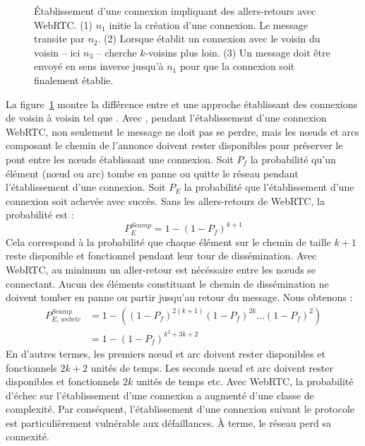 \begin{figure}
  \begin{center}
    
    \caption{\label{repl:fig:handshake} Établissement d'une connexion impliquant
      des allers-retours avec WebRTC. (1) $n_1$ initie la création d'une
      connexion. Le message transite par $n_2$. (2) Lorsque \CYCLON établit un
      connexion avec le voisin du voisin -- ici $n_3$ -- \SCAMP cherche
      $k$-voisins plus loin. (3) Un message doit être envoyé en sens inverse
      jusqu'à $n_1$ pour que la connexion soit finalement établie.}
  \end{center}
\end{figure}

\noindent La figure~\ref{repl:fig:handshake} montre la différence entre \SCAMP
et une approche établissant des connexions de voisin à voisin tel que
\CYCLON. Avec \SCAMP, pendant l'établissement d'une connexion WebRTC, non
seulement le message ne doit pas se perdre, mais les nœuds et arcs composant le
chemin de l'annonce doivent rester disponibles pour préserver le pont entre les
nœuds établissant une connexion.  Soit $P_f$ la probabilité qu'un élément (nœud
ou arc) tombe en panne ou quitte le réseau pendant l'établissement d'une
connexion. Soit $P_E$ la probabilité que l'établissement d'une connexion soit
achevée avec succès. Sans les allers-retours de WebRTC, la probabilité est :
\begin{equation} P_{E}^{Scamp}=1-(1- P_f)^{k+1} \end{equation} Cela
correspond à la probabilité que chaque élément sur le chemin de taille $k+1$
reste disponible et fonctionnel pendant leur tour de dissémination. Avec WebRTC,
au minimum un aller-retour est nécéssaire entre les nœuds se connectant. Aucun
des éléments constituant le chemin de dissémination ne doivent tomber en panne
ou partir jusqu'au retour du message. Nous obtenons : 
\begin{align} P_{E,\,webrtc}^{Scamp} &=1 - ((1-P_f)^{2(k+1)} (1-P_f)^{2k}
                                     \ldots (1-P_f)^2) \nonumber \\
                                   &=1-(1-P_f)^{k^2+3k+2}
\end{align}
En d'autres termes, les premiers nœud et arc doivent rester disponibles et
fonctionnels $2k +2$ unités de temps. Les seconds nœud et arc doivent rester
disponibles et fonctionnels $2k$ unités de temps etc. Avec WebRTC, la
probabilité d'échec sur l'établissement d'une connexion a augmenté d'une classe
de complexité.  Par conséquent, l'établissement d'une connexion suivant le
protocole \SCAMP est particulièrement vulnérable aux défaillances. À terme, le
réseau perd sa connexité.


